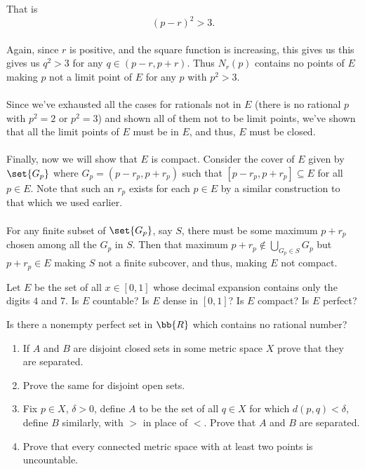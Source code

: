 \documentclass[12pt,letterpaper]{hmcpset}
\begin{document}
\begin{solution}
\[	\]
	That is
	\[
		(p - r)^2 > 3.
	\] \\
	Again, since $r$ is positive, and the square function is increasing, this gives us this gives us \( q^2 > 3 \) for any \( q \in (p - r, p + r) \). Thus $N_r(p)$ contains no points of $E$ making $p$ not a limit point of $E$ for any $p$ with \( p^2 > 3 \).\\\\
	Since we've exhausted all the cases for rationals not in $E$ (there is no rational $p$ with \( p^2 = 2 \) or \( p^2 = 3 \)) and shown all of them not to be limit points, we've shown that all the limit points of $E$ must be in $E$, and thus, $E$ must be closed.\\\\
	Finally, now we will show that $E$ is compact. Consider the cover of $E$ given by $\set{G_p}$ where \( G_p = (p - r_p, p + r_p) \) such that \( [p - r_p, p + r_p] \subseteq E \) for all \( p \in E \). Note that such an $r_p$ exists for each \( p \in E \) by a similar construction to that which we used earlier.\\\\
For any finite subset of $\set{G_p}$, say $S$, there must be some maximum $p + r_p$ chosen among all the $G_p$ in $S$. Then that maximum \( p + r_p \notin \bigcup_{G_p \in S} G_p \) but \( p + r_p \in E \) making $S$ not a finite subcover, and thus, making $E$ not compact.
\end{solution}

\begin{problem}[17.]
	Let $E$ be the set of all \( x \in [0, 1] \) whose decimal expansion contains only the digits $4$ and $7$. Is $E$ countable? Is $E$ dense in $[0, 1]$? Is $E$ compact? Is $E$ perfect?
\end{problem}

\begin{problem}[18.]
	Is there a nonempty perfect set in $\bb{R}$ which contains no rational number?
\end{problem}

\begin{problem}[19.]
	\begin{enumerate}
		\item If $A$ and $B$ are disjoint closed sets in some metric space $X$ prove that they are separated.
		\item Prove the same for disjoint open sets.
		\item Fix $p \in X$, $\delta > 0$, define $A$ to be the set of all $q \in X$ for which $d(p, q) < \delta$, define $B$ similarly, with $>$ in place of $<$. Prove that $A$ and $B$ are separated.
		\item Prove that every connected metric space with at least two points is uncountable.
	\end{enumerate}
\end{problem}
\end{document}
